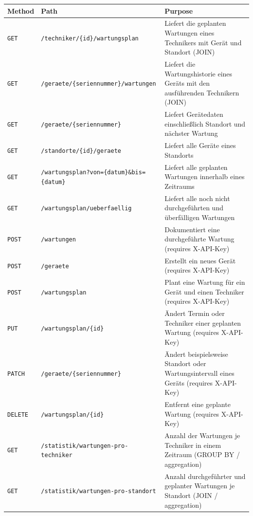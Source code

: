 \documentclass[11pt,a4paper]{article}
\begin{document}
\begin{tabularx}{\linewidth}{@{}p{2cm}p{4cm}X@{}}
\toprule
\textbf{Method} & \textbf{Path} & \textbf{Purpose} \\
\midrule
\texttt{GET}    & \texttt{/techniker/\{id\}/wartungsplan} 
& Liefert die geplanten Wartungen eines Technikers mit Gerät und Standort (JOIN) \\

\texttt{GET}    & \texttt{/geraete/\{seriennummer\}/wartungen} 
& Liefert die Wartungshistorie eines Geräts mit den ausführenden Technikern (JOIN) \\

\texttt{GET}    & \texttt{/geraete/\{seriennummer\}} 
& Liefert Gerätedaten einschließlich Standort und nächster Wartung \\

\texttt{GET}    & \texttt{/standorte/\{id\}/geraete} 
& Liefert alle Geräte eines Standorts \\

\texttt{GET}    & \texttt{/wartungsplan?von=\{datum\}\&bis=\{datum\}} 
& Liefert alle geplanten Wartungen innerhalb eines Zeitraums \\

\texttt{GET}    & \texttt{/wartungsplan/ueberfaellig} 
& Liefert alle noch nicht durchgeführten und überfälligen Wartungen \\

\texttt{POST}   & \texttt{/wartungen} 
& Dokumentiert eine durchgeführte Wartung (requires X-API-Key) \\

\texttt{POST}   & \texttt{/geraete} 
& Erstellt ein neues Gerät (requires X-API-Key) \\

\texttt{POST}   & \texttt{/wartungsplan} 
& Plant eine Wartung für ein Gerät und einen Techniker (requires X-API-Key) \\

\texttt{PUT}    & \texttt{/wartungsplan/\{id\}} 
& Ändert Termin oder Techniker einer geplanten Wartung (requires X-API-Key) \\

\texttt{PATCH}  & \texttt{/geraete/\{seriennummer\}} 
& Ändert beispielsweise Standort oder Wartungsintervall eines Geräts (requires X-API-Key) \\

\texttt{DELETE} & \texttt{/wartungsplan/\{id\}} 
& Entfernt eine geplante Wartung (requires X-API-Key) \\

\texttt{GET} & \texttt{/statistik/wartungen-pro-techniker} 
& Anzahl der Wartungen je Techniker in einem Zeitraum (GROUP BY / aggregation) \\

\texttt{GET} & \texttt{/statistik/wartungen-pro-standort} 
& Anzahl durchgeführter und geplanter Wartungen je Standort (JOIN / aggregation) \\
\bottomrule
\end{tabularx}
\end{document}
